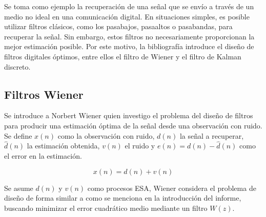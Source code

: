 \documentclass[a4paper]{article}
\begin{document}
 Se toma como ejemplo la recuperación de una señal que se envío a través de un medio no ideal en una comunicación digital. En situaciones simples, es posible utilizar filtros clásicos, como los pasabajos, pasaaltos o pasabandas, para recuperar la señal. Sin embargo, estos filtros no necesariamente proporcionan la mejor estimación posible. Por este motivo, la bibliografía introduce el diseño de filtros digitales óptimos, entre ellos el filtro de Wiener y el filtro de Kalman discreto.
 
 \subsection*{Filtros Wiener}
  
 
 
 
 Se introduce a Norbert Wiener quien investigo el problema del diseño de filtros para producir una estimación óptima de la señal desde una observación con ruido. Se define $x(n)$ como la observación con ruido, $d(n)$ la señal a recuperar, $\hat{d}(n)$ la estimación obtenida, $v(n)$ el ruido y $e(n) = d(n) - \hat{d}(n)$ como el error en la estimación.
 
 \begin{equation}
 	x(n) = d(n) + v(n)
 \end{equation}

 Se asume $d(n)$ y $v(n)$ como procesos ESA, Wiener considera el problema de diseño de forma similar a como se menciona en la introducción del informe, buscando minimizar el error cuadrático medio mediante un filtro $W(z)$.
\end{document}
